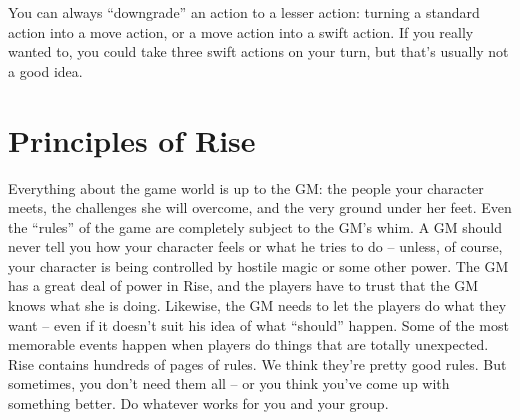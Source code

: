  You can always ``downgrade'' an action to a lesser action: turning a standard action into a move action, or a move action into a swift action. If you really wanted to, you could take three swift actions on your turn, but that's usually not a good idea.

\section{Principles of Rise}

\begin{itemize*}
     Everything about the game world is up to the GM: the people your character meets, the challenges she will overcome, and the very ground under her feet. Even the ``rules'' of the game are completely subject to the GM's whim.
     A GM should never tell you how your character feels or what he tries to do -- unless, of course, your character is being controlled by hostile magic or some other power.
     The GM has a great deal of power in Rise, and the players have to trust that the GM knows what she is doing. Likewise, the GM needs to let the players do what they want -- even if it doesn't suit his idea of what ``should'' happen. Some of the most memorable events happen when players do things that are totally unexpected.
     Rise contains hundreds of pages of rules. We think they're pretty good rules. But sometimes, you don't need them all -- or you think you've come up with something better. Do whatever works for you and your group.
\end{itemize*}
